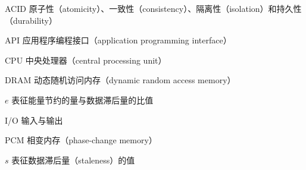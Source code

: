 \begin{denotation}
\item[ACID] 原子性（atomicity）、一致性（consistency）、隔离性（isolation）和持久性（durability）
\item[API] 应用程序编程接口（application programming interface）
\item[CPU] 中央处理器（central processing unit）
\item[DRAM] 动态随机访问内存（dynamic random access memory）
\item[$e$] 表征能量节约的量与数据滞后量的比值
\item[I/O] 输入与输出
\item[PCM] 相变内存（phase-change memory）
\item[$s$] 表征数据滞后量（staleness）的值
\end{denotation}
